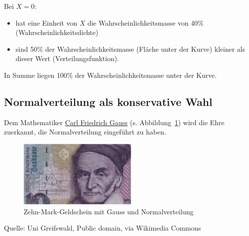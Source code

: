 \documentclass[
  a4paper,
  DIV=11]{scrreprt}
\providecommand{\tightlist}{%
  \setlength{\itemsep}{0pt}\setlength{\parskip}{0pt}}\usepackage{longtable,booktabs,array}
\theoremstyle{definition}
\theoremstyle{remark}
\begin{document}
Bei \(X=0\):

\begin{itemize}
\tightlist
\item
  hat eine Einheit von \(X\) die Wahrscheinlichkeitsmasse von 40\%
  (Wahrscheinlichkeitsdichte)
\item
  sind 50\% der Wahrscheinlichkeitsmasse (Fläche unter der Kurve)
  kleiner als dieser Wert (Verteilungsfunktion).
\end{itemize}

In Summe liegen 100\% der Wahrscheinlichkeitsmasse unter der Kurve.

\hypertarget{normalverteilung-als-konservative-wahl}{%
\subsection{Normalverteilung als konservative
Wahl}\label{normalverteilung-als-konservative-wahl}}

Dem Mathematiker
\href{https://de.wikipedia.org/wiki/Carl_Friedrich_Gau\%C3\%9F}{Carl
Friedrich Gauss} (s. Abbildung~\ref{fig-gauss}) wird die Ehre zuerkannt,
die Normalverteilung eingeführt zu haben.

\begin{figure}

{\centering \includegraphics[width=2.27in,height=\textheight]{./img/10_Deutsche_Mark_-_detail.png}

}

\caption{\label{fig-gauss}Zehn-Mark-Geldschein mit Gauss und
Normalverteilung}

\end{figure}

Quelle: Uni Greifswald, Public domain, via Wikimedia Commons
\end{document}
